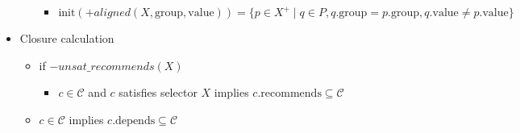 \documentclass[a4paper,english]{article}
\begin{document}
\begin{itemize}
\begin{itemize}
\begin{itemize}
          \item $\mathrm{init}({+}\mathit{aligned}(X,\mathrm{group},\mathrm{value}))=\{p\in X^{+}\mid q\in P, q.\mathrm{group} = p.\mathrm{group}, q.\mathrm{value} \neq p.\mathrm{value}\}$
        \end{itemize}
    \end{itemize}
  \item Closure calculation
    \begin{itemize}
      \item if ${-}\mathit{unsat\_recommends}(X)$
        \begin{itemize}
            \item $c\in \mathcal{C}$ and $c$ satisfies selector $X$ implies $c.\mathrm{recommends}\subseteq\mathcal{C}$
        \end{itemize}
        \item $c\in \mathcal{C}$ implies $c.\mathrm{depends}\subseteq\mathcal{C}$
    \end{itemize}
\end{itemize}
\end{document}

